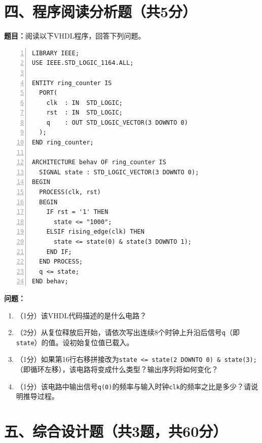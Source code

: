 \newpage

\section*{四、程序阅读分析题（共5分）}

\textbf{题目：}阅读以下VHDL程序，回答下列问题。

\vspace{0.3cm}

\begin{lstlisting}[caption={待分析VHDL程序——环形计数器}, language=VDL, numbers=left]
LIBRARY IEEE;
USE IEEE.STD_LOGIC_1164.ALL;

ENTITY ring_counter IS
  PORT(
    clk  : IN  STD_LOGIC;
    rst  : IN  STD_LOGIC;
    q    : OUT STD_LOGIC_VECTOR(3 DOWNTO 0)
  );
END ring_counter;

ARCHITECTURE behav OF ring_counter IS
  SIGNAL state : STD_LOGIC_VECTOR(3 DOWNTO 0);
BEGIN
  PROCESS(clk, rst)
  BEGIN
    IF rst = '1' THEN
      state <= "1000";
    ELSIF rising_edge(clk) THEN
      state <= state(0) & state(3 DOWNTO 1);
    END IF;
  END PROCESS;
  q <= state;
END behav;
\end{lstlisting}

\vspace{0.3cm}

\textbf{问题：}
\begin{enumerate}[label=(\arabic*)]
  \item （1分）该VHDL代码描述的是什么电路？
  \item （2分）从复位释放后开始，请依次写出连续8个时钟上升沿后信号\texttt{q}（即\texttt{state}）的值。设初始复位值已载入。
  \item （1分）如果第16行右移拼接改为\texttt{state <= state(2 DOWNTO 0) \& state(3);}（即循环左移），该电路将变成什么类型？输出序列将如何变化？
  \item （1分）该电路中输出信号\texttt{q(0)}的频率与输入时钟\texttt{clk}的频率之比是多少？请说明推导过程。
\end{enumerate}

\newpage

\section*{五、综合设计题（共3题，共60分）}

